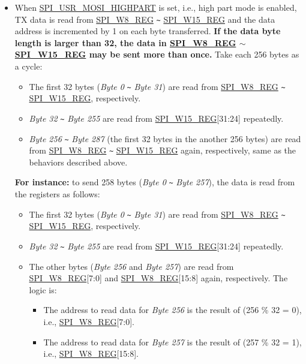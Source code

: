 \documentclass[main\_\_EN.tex]{subfiles}
\begin{document}
\begin{itemize}
\begin{itemize}
        \item When \hyperref[fielddesc:SPIUSRMOSIHIGHPART]{SPI\_USR\_MOSI\_HIGHPART} is set, i.e., high part mode is enabled, TX data is read from \hyperref[regdesc:SPIW0REG]{SPI\_W8\_REG} \verb+~+ \hyperref[regdesc:SPIW0REG]{SPI\_W15\_REG} and the data address is incremented by 1 on each byte transferred. \textbf{If the data byte length is larger than 32, the data in \hyperref[regdesc:SPIW0REG]{SPI\_W8\_REG} $\sim$ \hyperref[regdesc:SPIW0REG]{SPI\_W15\_REG} may be sent more than once.} Take each 256 bytes as a cycle:
        \begin{itemize}
            \item The first 32 bytes (\emph{Byte 0} \verb+~+ \emph{Byte 31}) are read from \hyperref[regdesc:SPIW0REG]{SPI\_W8\_REG} \verb+~+ \hyperref[regdesc:SPIW0REG]{SPI\_W15\_REG}, respectively.
            \item \emph{Byte 32} \verb+~+ \emph{Byte 255} are read from \hyperref[regdesc:SPIW0REG]{SPI\_W15\_REG}[31:24] repeatedly.
            \item \emph{Byte 256} \verb+~+ \emph{Byte 287} (the first 32 bytes in the another 256 bytes) are read from \hyperref[regdesc:SPIW0REG]{SPI\_W8\_REG} \verb+~+ \hyperref[regdesc:SPIW0REG]{SPI\_W15\_REG} again, respectively, same as the behaviors described above.
        \end{itemize}
        \textbf{For instance:} to send 258 bytes (\emph{Byte 0} \verb+~+ \emph{Byte 257}), the data is read from the registers as follows:
        \begin{itemize}
            \item The first 32 bytes (\emph{Byte 0} \verb+~+ \emph{Byte 31}) are read from \hyperref[regdesc:SPIW0REG]{SPI\_W8\_REG} \verb+~+ \hyperref[regdesc:SPIW0REG]{SPI\_W15\_REG}, respectively.
            \item \emph{Byte 32} \verb+~+ \emph{Byte 255} are read from \hyperref[regdesc:SPIW0REG]{SPI\_W15\_REG}[31:24] repeatedly.
            \item The other bytes (\emph{Byte 256} and \emph{Byte 257}) are read from \hyperref[regdesc:SPIW0REG]{SPI\_W8\_REG}[7:0] and \hyperref[regdesc:SPIW0REG]{SPI\_W8\_REG}[15:8] again, respectively. The logic is: 
            \begin{itemize}
                \item The address to read data for \emph{Byte 256} is the result of (256 \% 32 = 0), i.e., \hyperref[regdesc:SPIW0REG]{SPI\_W8\_REG}[7:0]. 
                \item The address to read data for \emph{Byte 257} is the result of (257 \% 32 = 1), i.e., \hyperref[regdesc:SPIW0REG]{SPI\_W8\_REG}[15:8].
            \end{itemize}
        \end{itemize}
    \end{itemize}
    

\end{itemize}
\end{document}
